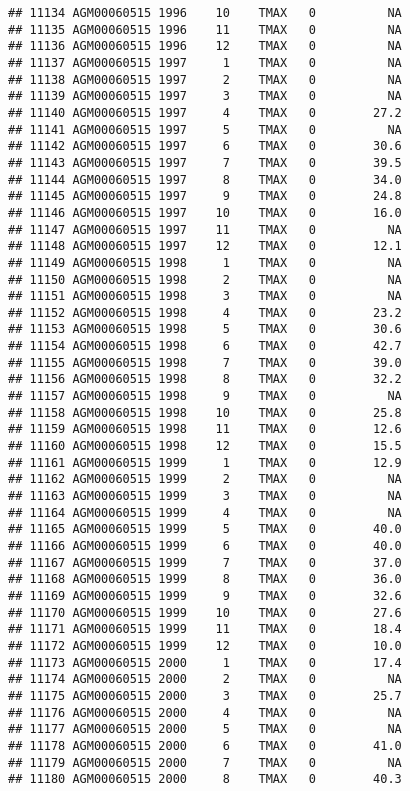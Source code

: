 \documentclass{article}\usepackage[]{graphicx}\usepackage[]{color}
\makeatletter
\newenvironment{kframe}{%
 \def\at@end@of@kframe{}%
 \ifinner\ifhmode%
  \def\at@end@of@kframe{\end{minipage}}%
  \begin{minipage}{\columnwidth}%
 \fi\fi%
 \def\FrameCommand##1{\hskip\@totalleftmargin \hskip-\fboxsep
 \colorbox{shadecolor}{##1}\hskip-\fboxsep
     \hskip-\linewidth \hskip-\@totalleftmargin \hskip\columnwidth}%
 \MakeFramed {\advance\hsize-\width
   \@totalleftmargin\z@ \linewidth\hsize
   \@setminipage}}%
 {\par\unskip\endMakeFramed%
 \at@end@of@kframe}
\newenvironment{knitrout}{}{} %
\makeatother
\begin{document}
\begin{knitrout}
\begin{kframe}
\begin{verbatim}
## 11134 AGM00060515 1996    10    TMAX   0          NA
## 11135 AGM00060515 1996    11    TMAX   0          NA
## 11136 AGM00060515 1996    12    TMAX   0          NA
## 11137 AGM00060515 1997     1    TMAX   0          NA
## 11138 AGM00060515 1997     2    TMAX   0          NA
## 11139 AGM00060515 1997     3    TMAX   0          NA
## 11140 AGM00060515 1997     4    TMAX   0        27.2
## 11141 AGM00060515 1997     5    TMAX   0          NA
## 11142 AGM00060515 1997     6    TMAX   0        30.6
## 11143 AGM00060515 1997     7    TMAX   0        39.5
## 11144 AGM00060515 1997     8    TMAX   0        34.0
## 11145 AGM00060515 1997     9    TMAX   0        24.8
## 11146 AGM00060515 1997    10    TMAX   0        16.0
## 11147 AGM00060515 1997    11    TMAX   0          NA
## 11148 AGM00060515 1997    12    TMAX   0        12.1
## 11149 AGM00060515 1998     1    TMAX   0          NA
## 11150 AGM00060515 1998     2    TMAX   0          NA
## 11151 AGM00060515 1998     3    TMAX   0          NA
## 11152 AGM00060515 1998     4    TMAX   0        23.2
## 11153 AGM00060515 1998     5    TMAX   0        30.6
## 11154 AGM00060515 1998     6    TMAX   0        42.7
## 11155 AGM00060515 1998     7    TMAX   0        39.0
## 11156 AGM00060515 1998     8    TMAX   0        32.2
## 11157 AGM00060515 1998     9    TMAX   0          NA
## 11158 AGM00060515 1998    10    TMAX   0        25.8
## 11159 AGM00060515 1998    11    TMAX   0        12.6
## 11160 AGM00060515 1998    12    TMAX   0        15.5
## 11161 AGM00060515 1999     1    TMAX   0        12.9
## 11162 AGM00060515 1999     2    TMAX   0          NA
## 11163 AGM00060515 1999     3    TMAX   0          NA
## 11164 AGM00060515 1999     4    TMAX   0          NA
## 11165 AGM00060515 1999     5    TMAX   0        40.0
## 11166 AGM00060515 1999     6    TMAX   0        40.0
## 11167 AGM00060515 1999     7    TMAX   0        37.0
## 11168 AGM00060515 1999     8    TMAX   0        36.0
## 11169 AGM00060515 1999     9    TMAX   0        32.6
## 11170 AGM00060515 1999    10    TMAX   0        27.6
## 11171 AGM00060515 1999    11    TMAX   0        18.4
## 11172 AGM00060515 1999    12    TMAX   0        10.0
## 11173 AGM00060515 2000     1    TMAX   0        17.4
## 11174 AGM00060515 2000     2    TMAX   0          NA
## 11175 AGM00060515 2000     3    TMAX   0        25.7
## 11176 AGM00060515 2000     4    TMAX   0          NA
## 11177 AGM00060515 2000     5    TMAX   0          NA
## 11178 AGM00060515 2000     6    TMAX   0        41.0
## 11179 AGM00060515 2000     7    TMAX   0          NA
## 11180 AGM00060515 2000     8    TMAX   0        40.3

\end{verbatim}
\end{kframe}
\end{knitrout}
\end{document}
